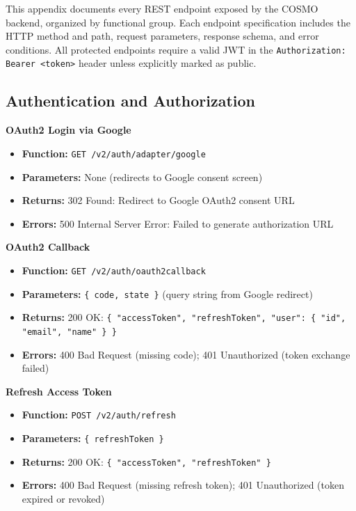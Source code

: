 \documentclass[a4paper]{article}
\begin{document}
This appendix documents every REST endpoint exposed by the COSMO
backend, organized by functional group. Each endpoint specification
includes the HTTP method and path, request parameters, response
schema, and error conditions. All protected endpoints require a
valid JWT in the \texttt{Authorization: Bearer <token>} header
unless explicitly marked as public.

\subsection{Authentication and Authorization}

\textbf{OAuth2 Login via Google}
\begin{itemize}
  \item \textbf{Function:} \texttt{GET /v2/auth/adapter/google}
  \item \textbf{Parameters:} None (redirects to Google consent screen)
  \item \textbf{Returns:} 302 Found: Redirect to Google OAuth2 consent URL
  \item \textbf{Errors:} 500 Internal Server Error: Failed to generate authorization URL
\end{itemize}

\textbf{OAuth2 Callback}
\begin{itemize}
  \item \textbf{Function:} \texttt{GET /v2/auth/oauth2callback}
  \item \textbf{Parameters:} \texttt{\{ code, state \}} (query string from Google redirect)
  \item \textbf{Returns:} 200 OK: \texttt{\{ "accessToken", "refreshToken", "user": \{ "id", "email", "name" \} \}}
  \item \textbf{Errors:} 400 Bad Request (missing code); 401 Unauthorized (token exchange failed)
\end{itemize}

\textbf{Refresh Access Token}
\begin{itemize}
  \item \textbf{Function:} \texttt{POST /v2/auth/refresh}
  \item \textbf{Parameters:} \texttt{\{ refreshToken \}}
  \item \textbf{Returns:} 200 OK: \texttt{\{ "accessToken", "refreshToken" \}}
  \item \textbf{Errors:} 400 Bad Request (missing refresh token); 401 Unauthorized (token expired or revoked)
\end{itemize}
\end{document}
